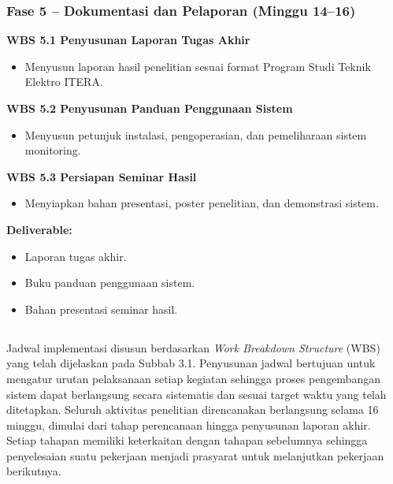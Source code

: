 \documentclass{elsinta}
\begin{document}
\subsubsection*{Fase 5 -- Dokumentasi dan Pelaporan (Minggu 14--16)}

\textbf{WBS 5.1 Penyusunan Laporan Tugas Akhir}

\begin{itemize}
    \item Menyusun laporan hasil penelitian sesuai format Program Studi Teknik Elektro ITERA.
\end{itemize}

\textbf{WBS 5.2 Penyusunan Panduan Penggunaan Sistem}

\begin{itemize}
    \item Menyusun petunjuk instalasi, pengoperasian, dan pemeliharaan sistem monitoring.
\end{itemize}

\textbf{WBS 5.3 Persiapan Seminar Hasil}

\begin{itemize}
    \item Menyiapkan bahan presentasi, poster penelitian, dan demonstrasi sistem.
\end{itemize}

\textbf{Deliverable:}
\begin{itemize}
    \item Laporan tugas akhir.
    \item Buku panduan penggunaan sistem.
    \item Bahan presentasi seminar hasil.
\end{itemize}

\subsection{\TimelineTitle}
Jadwal implementasi disusun berdasarkan \textit{Work Breakdown Structure} (WBS) yang telah dijelaskan pada Subbab 3.1. Penyusunan jadwal bertujuan untuk mengatur urutan pelaksanaan setiap kegiatan sehingga proses pengembangan sistem dapat berlangsung secara sistematis dan sesuai target waktu yang telah ditetapkan. Seluruh aktivitas penelitian direncanakan berlangsung selama 16 minggu, dimulai dari tahap perencanaan hingga penyusunan laporan akhir. Setiap tahapan memiliki keterkaitan dengan tahapan sebelumnya sehingga penyelesaian suatu pekerjaan menjadi prasyarat untuk melanjutkan pekerjaan berikutnya.
\end{document}
